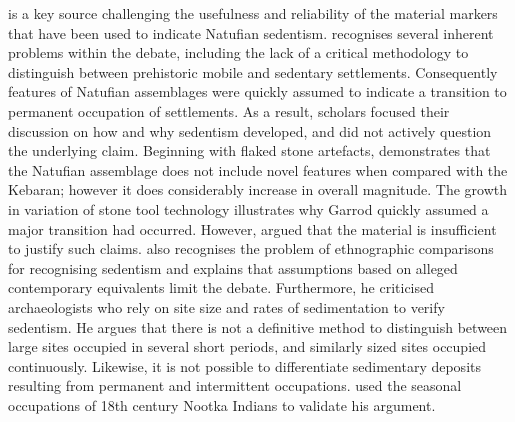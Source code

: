 \textcite[8--15]{Edwards_1989} is a key source challenging the usefulness and reliability of the material markers that have been used to indicate Natufian sedentism. 
\citeauthor{Edwards_1989}
recognises several inherent problems within the debate, including the lack of a critical methodology to distinguish between prehistoric mobile and sedentary settlements. Consequently features of Natufian assemblages were quickly assumed to indicate a transition to permanent occupation of settlements. 
As a result, scholars focused their discussion on how and why sedentism developed, and did not actively question the underlying claim.
Beginning with flaked stone artefacts, 
\citeauthor{Edwards_1989}
demonstrates that the Natufian assemblage does not include novel features when compared with the Kebaran; however it does considerably increase in overall magnitude. 
The growth in variation of stone tool technology illustrates why Garrod quickly assumed a major transition had occurred. However, 
\citeauthor{Edwards_1989}
argued that the material is insufficient to justify such claims. 
\citeauthor{Edwards_1989}
also recognises the problem of ethnographic comparisons for recognising sedentism and explains that assumptions based on alleged contemporary equivalents limit the debate. 
Furthermore, he criticised archaeologists who rely on site size and rates of sedimentation to verify sedentism. %
He argues that there is not a definitive method to distinguish between large sites occupied in several short periods, and similarly sized sites occupied continuously. %
Likewise, it is not possible to differentiate sedimentary deposits resulting from permanent and intermittent occupations. 
\citeauthor{Edwards_1989}
used the seasonal occupations of 18th century Nootka Indians to validate his argument. 

